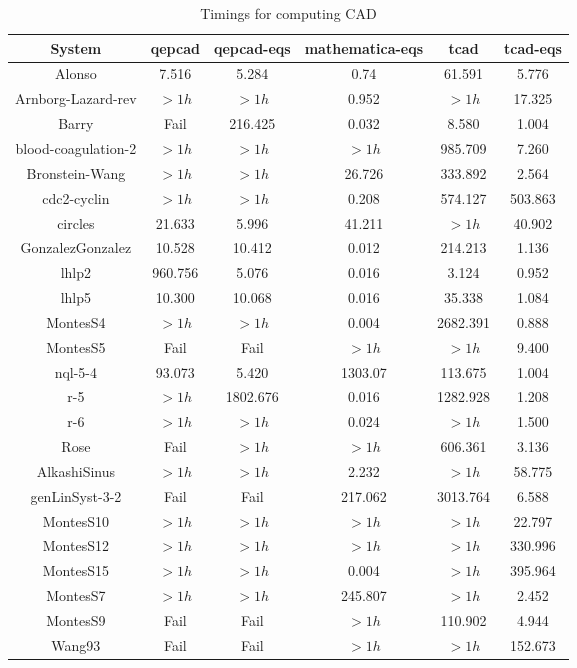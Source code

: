\documentclass[10pt]{article}
\newcommand{\CAD}{{CAD}}
\begin{document}
\begin{table}
\centering
\caption{Timings for computing {\CAD}}
\label{table:cad}
\begin{tabular}{|c|c|c|c|c|c|}\hline
System & qepcad & qepcad-eqs & mathematica-eqs & tcad & tcad-eqs\\ \hline
Alonso & 7.516 & 5.284 & 0.74& 	  61.591 & 	  5.776 \\
Arnborg-Lazard-rev &$> 1h$ &$> 1h$ & 0.952&  	 $> 1h$ & 	  17.325 \\
Barry & Fail& 216.425 & 0.032& 	  8.580 & 	  1.004 \\
blood-coagulation-2 & $> 1h$ & $> 1h$ & $> 1h$& 	  985.709 & 	  7.260 \\
Bronstein-Wang & $> 1h$ & $> 1h$ & 26.726& 	  333.892 & 	  2.564 \\
cdc2-cyclin & $> 1h$ & $> 1h$ & 0.208& 	  574.127 & 	  503.863 \\
circles & 21.633 & 5.996 & 41.211&  	 $> 1h$ & 	  40.902 \\
GonzalezGonzalez & 10.528 & 10.412 & 0.012& 	  214.213 & 	  1.136 \\
lhlp2 & 960.756 & 5.076 & 0.016& 	  3.124 & 	  0.952 \\
lhlp5 & 10.300 & 10.068 & 0.016& 	  35.338 & 	  1.084 \\
MontesS4 & $> 1h$  & $> 1h$ & 0.004& 	  2682.391 & 	  0.888 \\
MontesS5 & Fail & Fail & $> 1h$&  	 $> 1h$ & 	  9.400 \\
nql-5-4 & 93.073 & 5.420 & 1303.07& 	  113.675 & 	  1.004 \\
r-5 &$> 1h$ & 1802.676 & 0.016& 	  1282.928 & 	  1.208 \\
r-6 &$> 1h$ & $> 1h$ & 0.024&  	 $> 1h$ & 	  1.500 \\
Rose & Fail& $> 1h$  & $> 1h$& 	  606.361 & 	  3.136 \\
AlkashiSinus &      $> 1h$               &      $> 1h$               & 2.232&  	 $> 1h$ & 	  58.775 \\
genLinSyst-3-2 &   Fail     &   Fail    & 217.062& 	  3013.764 & 	  6.588 \\
MontesS10 &  $> 1h$  &  $> 1h$  & $> 1h$&  	 $> 1h$ & 	  22.797 \\
MontesS12 &  $> 1h$ & $> 1h$  & $> 1h$&  	 $> 1h$ & 	  330.996 \\
MontesS15 &$> 1h$ &$> 1h$ & 0.004&  	 $> 1h$ & 	  395.964 \\
MontesS7 & $> 1h$ &$> 1h$ & 245.807&  	 $> 1h$ & 	  2.452 \\
MontesS9 &Fail & Fail & $> 1h$& 	  110.902 & 	  4.944 \\
Wang93 & Fail& Fail& $> 1h$&  	 $> 1h$ & 	  152.673 \\

\hline
\end{tabular}
\end{table}
\end{document}

